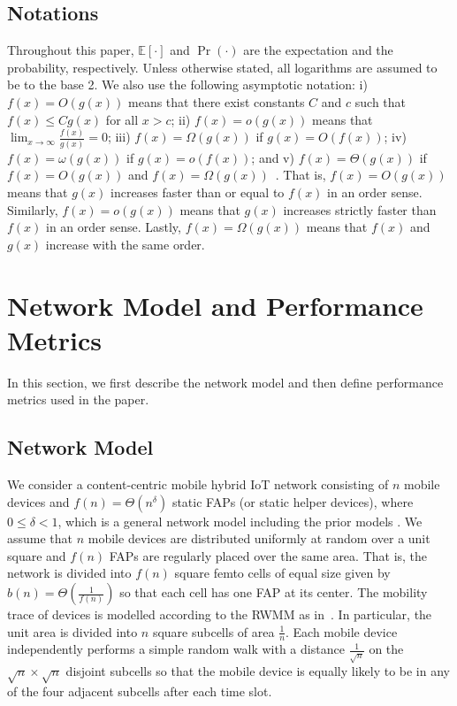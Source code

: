 \documentclass[10pt,journal,compsoc,onecolumn]{IEEEtran}
\begin{document}
\subsection{Notations}
Throughout this paper, $\mathbb{E}\left[\cdot\right]$  and
$\Pr\left(\cdot\right)$ are the expectation and the probability,
respectively. Unless otherwise stated, all logarithms are assumed
to be to the base 2. We also use the following asymptotic
notation: i) $f(x)=O(g(x))$ means that there exist constants $C$
and $c$ such that $f(x)\leq Cg(x)$ for all $x>c$; ii)
$f(x)=o(g(x))$ means that $\lim_{x\rightarrow \infty}
\frac{f(x)}{g(x)}=0$; iii) $f(x)=\Omega(g(x))$ if $g(x)=O(f(x))$;
iv) $f(x)=\omega(g(x))$ if $g(x)=o(f(x))$; and v)
$f(x)=\Theta(g(x))$ if $f(x)=O(g(x))$ and
$f(x)=\Omega(g(x))$~\cite{c10}. That is, $f(x)=O(g(x))$ means that $g(x)$ increases faster than or equal to $f(x)$ in an order sense. Similarly, $f(x)=o(g(x))$  means that $g(x)$ increases strictly faster than $f(x)$ in an order sense. Lastly, $f(x)=\Omega(g(x))$ means that $f(x)$ and $g(x)$ increase with the same order.

\section{Network Model and Performance Metrics} \label{SEC:model}
In this section, we first describe the network model and then define performance metrics used in the paper.

\subsection{Network Model}
We consider a content-centric mobile hybrid IoT network consisting of
$n$ mobile devices and $f(n)=\Theta(n^{\delta})$ static FAPs (or
static helper devices), where $0\leq\delta<1$, which is a general network model including the prior models \cite{singlehop,c1,c2,Ji_IT,c5,c3,a1}.
We assume that $n$ mobile devices are distributed uniformly at random over a unit square and $f(n)$ FAPs are regularly placed over the same area. That is, the network is divided into $f(n)$ square femto cells of equal size given by $b(n)=\Theta\left(\frac{1}{f(n)}\right)$ so that each cell has one FAP at its center. %
The mobility trace of devices is modelled according to the RWMM as in~\cite{c1,RW2}. In particular, the unit area is divided into $n$ square subcells of area $\frac{1}{n}$. %
Each mobile device independently performs a simple random walk with a
distance $\frac{1}{\sqrt{n}}$ on the $\sqrt{n}\times\sqrt{n}$
disjoint subcells so that the mobile device is equally likely to be in any
of the four adjacent subcells after each time slot.
\end{document}
